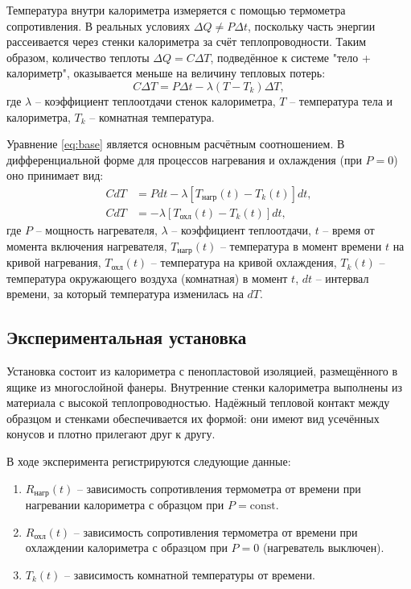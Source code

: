 \documentclass[a4paper,12pt]{article}
\begin{document}
Температура внутри калориметра измеряется с помощью термометра сопротивления. В реальных условиях $\Delta Q \neq P\Delta t$, поскольку часть энергии рассеивается через стенки калориметра за счёт теплопроводности. Таким образом, количество теплоты $\Delta Q = C\Delta T$, подведённое к системе "тело + калориметр", оказывается меньше на величину тепловых потерь:
\begin{equation}
    C\Delta T = P\Delta t - \lambda(T - T_k)\Delta T,
    \label{eq:base}
\end{equation}
где $\lambda$ – коэффициент теплоотдачи стенок калориметра, $T$ – температура тела и калориметра, $T_k$ – комнатная температура.

Уравнение \eqref{eq:base} является основным расчётным соотношением. В дифференциальной форме для процессов нагревания и охлаждения (при $P=0$) оно принимает вид:
\begin{equation}
    \begin{aligned}
        C dT &= P dt - \lambda[T_{\text{нагр}}(t) - T_k(t)] dt, \\
        C dT &= -\lambda[T_{\text{охл}}(t) - T_k(t)] dt,
    \end{aligned}
    \label{eq:diff}
\end{equation}
где $P$ – мощность нагревателя, $\lambda$ – коэффициент теплоотдачи, $t$ – время от момента включения нагревателя, $T_{\text{нагр}}(t)$ – температура в момент времени $t$ на кривой нагревания, $T_{\text{охл}}(t)$ – температура на кривой охлаждения, $T_k(t)$ – температура окружающего воздуха (комнатная) в момент $t$, $dt$ – интервал времени, за который температура изменилась на $dT$.

\subsection{Экспериментальная установка}
Установка состоит из калориметра с пенопластовой изоляцией, размещённого в ящике из многослойной фанеры. Внутренние стенки калориметра выполнены из материала с высокой теплопроводностью. Надёжный тепловой контакт между образцом и стенками обеспечивается их формой: они имеют вид усечённых конусов и плотно прилегают друг к другу.

В ходе эксперимента регистрируются следующие данные:
\begin{enumerate}
    \item $R_{\text{нагр}}(t)$ – зависимость сопротивления термометра от времени при нагревании калориметра с образцом при $P = \text{const}$.
    \item $R_{\text{охл}}(t)$ – зависимость сопротивления термометра от времени при охлаждении калориметра с образцом при $P = 0$ (нагреватель выключен).
    \item $T_k(t)$ – зависимость комнатной температуры от времени.
\end{enumerate}
\end{document}

